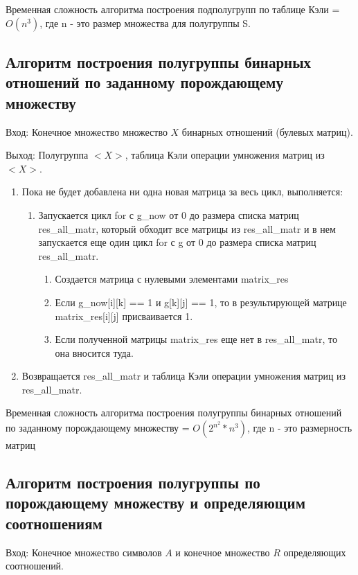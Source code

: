 \documentclass[bachelor, och, labwork]{shiza}
\begin{document}
	Временная сложность алгоритма построения подполугрупп по таблице Кэли = $O(n^3)$, где n - это размер множества для полугруппы S.
	
	\subsection{Алгоритм построения полугруппы бинарных отношений по заданному порождающему множеству}
	
	$\textit{Вход:}$ Конечное множество множество $X$ бинарных отношений (булевых матриц).
	
	$\textit{Выход:}$  Полугруппа $<X>$, таблица Кэли операции умножения матриц из $<X>$.
	
	\begin{enumerate} 
		\item Пока не будет добавлена ни одна новая матрица за весь цикл, выполняется:
		\begin{enumerate} 
			\item Запускается цикл for с g\_now от 0 до размера списка матриц res\_all\_matr, который обходит все матрицы из res\_all\_matr и в нем запускается еще один цикл for с g от 0 до размера списка матриц res\_all\_matr.
				\begin{enumerate} 
						\item Создается матрица с нулевыми элементами  matrix\_res
						\item Если g\_now[i][k] == 1 и  g[k][j] == 1, то в результирующей матрице matrix\_res[i][j] присваивается 1.
						\item Если полученной матрицы matrix\_res еще нет в res\_all\_matr, то она вносится туда.
				\end{enumerate}
		\end{enumerate}
		\item Возвращается res\_all\_matr и таблица Кэли операции умножения матриц из res\_all\_matr.
	\end{enumerate} 
	
	Временная сложность алгоритма построения полугруппы бинарных отношений по заданному порождающему множеству = $O(2^{n^2} * n^3)$, где n - это размерность матриц
	
	\subsection{Алгоритм построения полугруппы по порождающему множеству и определяющим соотношениям}
	
	$\textit{Вход:}$ Конечное множество символов $A$ и конечное множество $R$ определяющих соотношений.
	
\end{document}
